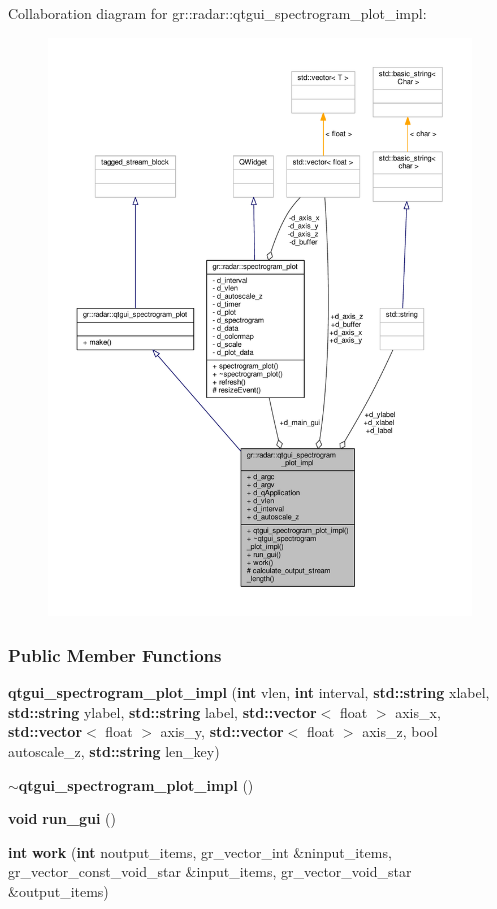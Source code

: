 Collaboration diagram for gr\+:\+:radar\+:\+:qtgui\+\_\+spectrogram\+\_\+plot\+\_\+impl\+:
\nopagebreak
\begin{figure}[H]
\begin{center}
\leavevmode
\includegraphics[width=350pt]{d1/dcd/classgr_1_1radar_1_1qtgui__spectrogram__plot__impl__coll__graph}
\end{center}
\end{figure}
\subsubsection*{Public Member Functions}
\begin{DoxyCompactItemize}
\item 
{\bf qtgui\+\_\+spectrogram\+\_\+plot\+\_\+impl} ({\bf int} vlen, {\bf int} interval, {\bf std\+::string} xlabel, {\bf std\+::string} ylabel, {\bf std\+::string} label, {\bf std\+::vector}$<$ float $>$ axis\+\_\+x, {\bf std\+::vector}$<$ float $>$ axis\+\_\+y, {\bf std\+::vector}$<$ float $>$ axis\+\_\+z, bool autoscale\+\_\+z, {\bf std\+::string} len\+\_\+key)
\item 
{\bf $\sim$qtgui\+\_\+spectrogram\+\_\+plot\+\_\+impl} ()
\item 
{\bf void} {\bf run\+\_\+gui} ()
\item 
{\bf int} {\bf work} ({\bf int} noutput\+\_\+items, gr\+\_\+vector\+\_\+int \&ninput\+\_\+items, gr\+\_\+vector\+\_\+const\+\_\+void\+\_\+star \&input\+\_\+items, gr\+\_\+vector\+\_\+void\+\_\+star \&output\+\_\+items)
\end{DoxyCompactItemize}
